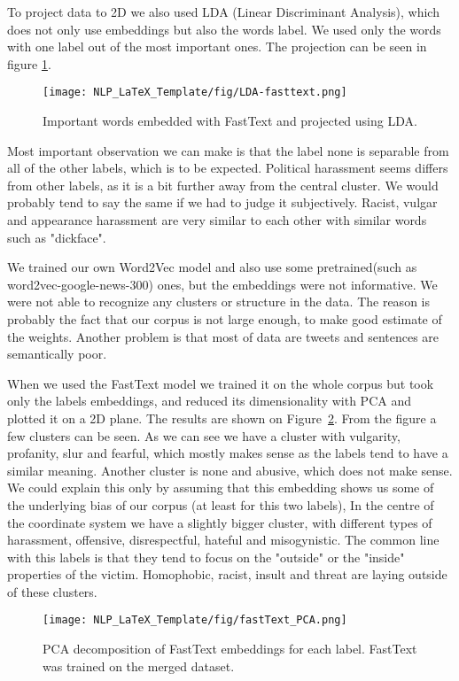 \documentclass[fleqn,moreauthors,10pt]{ds_report}
\begin{document}
To project data to 2D we also used LDA (Linear Discriminant Analysis), which does not only use embeddings but also the words label. We used only the words with one label out of the most important ones. The projection can be seen in figure \ref{fig:fasttext_LDA}.
\begin{figure}
    \centering
    \texttt{[image: NLP\_LaTeX\_Template/fig/LDA-fasttext.png]}%
    \caption{Important words embedded with FastText and projected using LDA.}
    \label{fig:fasttext_LDA}
\end{figure}
Most important observation we can make is that the label none is separable from all of the other labels, which is to be expected. Political harassment seems differs from other labels, as it is a bit further away from the central cluster. We would probably tend to say the same if we had to judge it subjectively. Racist, vulgar and appearance harassment are very similar to each other with similar words such as "dickface".

We trained our own Word2Vec model and also use some pretrained(such as word2vec-google-news-300) ones, but the embeddings were not informative. We were not able to recognize any clusters or structure in the data. The reason is probably the fact that our corpus is not large enough, to make good estimate of the weights. Another problem is that most of data are tweets and sentences are semantically poor. 

When we used the FastText model we trained it on the whole corpus but took only the labels embeddings, and reduced its dimensionality with PCA and plotted it on a 2D plane. The results are shown on Figure~\ref{fig:fasttextpca}. From the figure a few clusters can be seen. As we can see we have a cluster with vulgarity, profanity, slur and fearful, which mostly makes sense as the labels tend to have a similar meaning. Another cluster is none and abusive, which does not make sense. We could explain this only by assuming that this embedding shows us some of the underlying bias of our corpus (at least for this two labels), In the centre of the coordinate system we have a slightly bigger cluster, with different types of harassment, offensive, disrespectful, hateful and misogynistic. The common line with this labels is that they tend to focus on the "outside" or the "inside" properties of the victim. Homophobic, racist, insult and threat are laying outside of these clusters.
\begin{figure}
    \centering
    \texttt{[image: NLP\_LaTeX\_Template/fig/fastText\_PCA.png]}
    \caption{PCA decomposition of FastText embeddings for each label. FastText was trained on the merged dataset.}
    \label{fig:fasttextpca}
\end{figure}
\end{document}
